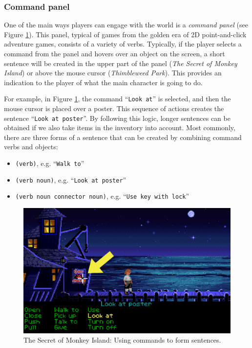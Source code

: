 \subsubsection{Command panel}
\label{ActionPanel}
One of the main ways players can engage with the world is a \textit{command panel} (see Figure \ref{fig:C-TSoMI}). This panel, typical of games from the golden era of 2D point-and-click adventure games, consists of a variety of verbs. Typically, if the player selects a command from the panel and hovers over an object on the screen, a short sentence will be created in the upper part of the panel (\textit{The Secret of Monkey Island}) or above the mouse cursor (\textit{Thimbleweed Park}). This provides an indication to the player of what the main character is going to do. 

For example, in Figure \ref{fig:C-TSoMI}, the command “\texttt{Look at}” is selected, and then the mouse cursor is placed over a poster. This sequence of actions creates the sentence “\texttt{Look at poster}”. By following this logic, longer sentences can be obtained if we also take items in the inventory into account. Most commonly, there are three forms of a sentence that can be created by combining command verbs and objects:
\begin{itemize}
    \item \verb|(verb)|, e.g. “\texttt{Walk to}”
    \item \verb|(verb noun)|, e.g. “\texttt{Look at poster}”
    \item \verb|(verb noun connector noun)|, e.g. “\texttt{Use key with lock}”
\end{itemize}

\begin{figure}[H]
\centering
\includegraphics[width=.75\linewidth]{img/C-TSoMI.png}
\caption{The Secret of Monkey Island: Using commands to form sentences.}
\label{fig:C-TSoMI}
\end{figure}
 
